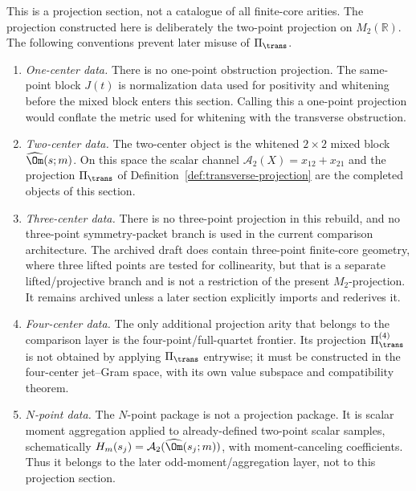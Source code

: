 \begin{remark}
\label{rem:transverse-projection-arity-scope}
This is a projection section, not a catalogue of all finite-core arities.
The projection constructed here is deliberately the two-point projection
on \(M_2(\mathbb R)\).  The following conventions prevent later misuse of
\(\Pi_\trans\).
\begin{enumerate}[label=\textup{(\alph*)},leftmargin=*]
\item \emph{One-center data.}  There is no one-point obstruction
projection.  The same-point block \(J(t)\) is normalization data used for
positivity and whitening before the mixed block enters this section.
Calling this a one-point projection would conflate the metric used for
whitening with the transverse obstruction.
\item \emph{Two-center data.}  The two-center object is the whitened
\(2\times2\) mixed block \(\widehat\Om(s;m)\).  On this space the scalar
channel \(\mathcal A_2(X)=x_{12}+x_{21}\) and the projection
\(\Pi_\trans\) of Definition~\ref{def:transverse-projection} are the
completed objects of this section.
\item \emph{Three-center data.}  There is no three-point projection in
this rebuild, and no three-point symmetry-packet branch is used in the
current comparison architecture.  The archived draft does contain
three-point finite-core geometry, where three lifted points are tested for
collinearity, but that is a separate lifted/projective branch and is not
a restriction of the present \(M_2\)-projection.  It remains archived
unless a later section explicitly imports and rederives it.
\item \emph{Four-center data.}  The only additional projection arity that
belongs to the comparison layer is the four-point/full-quartet frontier.
Its projection \(\Pi_\trans^{(4)}\) is not obtained by applying
\(\Pi_\trans\) entrywise; it must be constructed in the four-center
jet--Gram space, with its own value subspace and compatibility theorem.
\item \emph{\(N\)-point data.}  The \(N\)-point package is not a projection
package.  It is scalar moment aggregation applied to already-defined
two-point scalar samples, schematically
\(H_m(s_j)=\mathcal A_2(\widehat\Om(s_j;m))\), with moment-canceling
coefficients.  Thus it belongs to the later odd-moment/aggregation layer,
not to this projection section.
\end{enumerate}
\end{remark}

